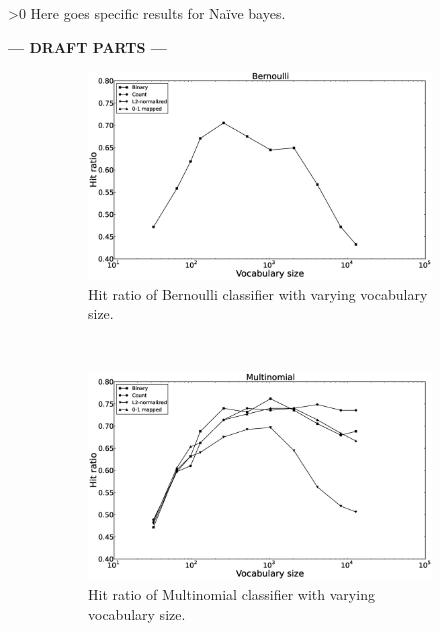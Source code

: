 \ifnum\printdraft>0
	Here goes specific results for Naïve bayes.
\else
\begin{center}
  	\textbf{--- DRAFT PARTS ---}
\end{center}
\fi
\onecolumn
\newcommand{\figwidth}{0.45\textwidth}
\begin{figure}[H]
	\centering
	\begin{subfigure}[b]{\figwidth}
		\includegraphics[width=\textwidth]{Bernoulli-hitrate.eps}
		\caption{Hit ratio of Bernoulli classifier with varying vocabulary size.}
		\label{fig:hitrate-nb}
	\end{subfigure}
	~
	\begin{subfigure}[b]{\figwidth}
		\includegraphics[width=\textwidth]{Multinomial-hitrate.eps}
		\caption{Hit ratio of Multinomial classifier with varying vocabulary size.}
		\label{fig:hitrate-mn}
	\end{subfigure}
	\\
	\begin{subfigure}[b]{\figwidth}

\end{subfigure}
\end{figure}
